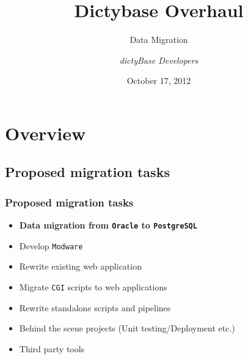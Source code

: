 \documentclass[hyperref={pdfpagelabels=false}, compress]{beamer}
\title{\textbf{Dictybase Overhaul}}
\subtitle{Data Migration}
\author{\textit{dictyBase Developers}}
\date{October 17, 2012}
\begin{document}
\frame{\titlepage}



\section{Overview}

\subsection{Proposed migration tasks}
\begin{frame}
	\frametitle{Proposed migration tasks}
	
    	\begin{itemize}
		\item \textbf{Data migration from \texttt{Oracle} to \texttt{PostgreSQL}}
		\vspace{0.5cm}
    		\item Develop \texttt{Modware}
    		\item Rewrite existing web application
    		\item Migrate \texttt{CGI} scripts to web applications 
    		\item Rewrite standalone scripts and pipelines
    		\item Behind the scene projects (Unit testing/Deployment etc.)
    		\item Third party tools
	\end{itemize}
\end{frame}
\end{document}
